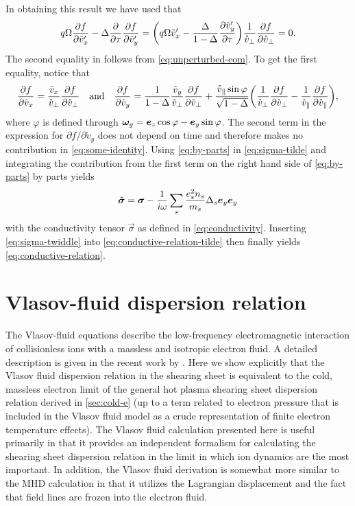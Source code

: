 \documentclass[aps,pre,notitlepage,amsmath,amssymb,amsfonts,nobibnotes,nofootinbib]{revtex4-1}
\begin{document}
In obtaining this result we have used that
\begin{equation}
  \label{eq:some-identity}
  q\Omega\pder{f}{\tilde{v}_x'}
  - \Delta\pder{}{\tau}\pder{f}{\tilde{v}_y'}
  = \left(
    q\Omega\tilde{v}_x' - \frac{\Delta}{1-\Delta}\pder{\tilde{v}_y'}{\tau}
  \right)
  \frac{1}{\vc_\perp}\pder{f}{\vc_\perp} = 0.
\end{equation}
The second equality in follows from \cref{eq:unperturbed-eom}. To get the
first equality, notice that
\begin{equation}
  \pder{f}{\tilde{v}_x} = \frac{\tilde{v}_x}{\vc_\perp}\pder{f}{\vc_\perp}
  \quad\textrm{and}\quad
  \pder{f}{\tilde{v}_y} =
  \frac{1}{1-\Delta}\frac{\tilde{v}_y}{\vc_\perp}\pder{f}{\vc_\perp}
  + \frac{\vc_\parallel\sin\varphi}{\sqrt{1-\Delta}}\left(
    \frac{1}{\vc_\perp}\pder{f}{\vc_\perp}
    - \frac{1}{\vc_\parallel}\pder{f}{\vc_\parallel}
  \right),
\end{equation}
where $\varphi$ is defined through $\bm{\omega}_g=\bm{e}_z\cos\varphi-\bm{e}_y\sin\varphi$. The
second term in the expression for $\partial{}f/\partial\tilde{v}_y$ does not
depend on time and therefore makes no contribution in \cref{eq:some-identity}.
Using \cref{eq:by-parts} in \cref{eq:sigma-tilde} and integrating the
contribution from the first term on the right hand side of \cref{eq:by-parts}
by parts yields
\begin{equation}
  \label{eq:sigma-twiddle}
  \tvec{\sigma} = \vec{\sigma}
  - \frac{1}{i\omega}\sums\frac{\qs^2n_s}{m_s}\Delta_s\ey\ey
\end{equation}
with the conductivity tensor $\vec{\sigma}$ as defined in
\cref{eq:conductivity}. Inserting \cref{eq:sigma-twiddle} into
\cref{eq:conductive-relation-tilde} then finally yields
\cref{eq:conductive-relation}.

\section{Vlasov-fluid dispersion relation}
\label{app:vlasov-fluid}

The Vlasov-fluid equations \citep{Freidberg1972} describe the low-frequency
electromagnetic interaction of collisionless ions with a massless and
isotropic electron fluid. A detailed description is given in the recent work
by \citet{Cerfon2011}. Here we show explicitly that the Vlasov fluid
dispersion relation in the shearing sheet is equivalent to the cold, massless
electron limit of the general hot plasma shearing sheet dispersion relation
derived in \cref{sec:cold-e} (up to a term related to electron pressure that
is included in the Vlasov fluid model as a crude representation of finite
electron temperature effects). The Vlasov fluid calculation presented here is
useful primarily in that it provides an independent formalism for calculating
the shearing sheet dispersion relation in the limit in which ion dynamics are
the most important. In addition, the Vlasov fluid derivation is somewhat more
similar to the MHD calculation in that it utilizes the Lagrangian displacement
and the fact that field lines are frozen into the electron fluid.
\end{document}
